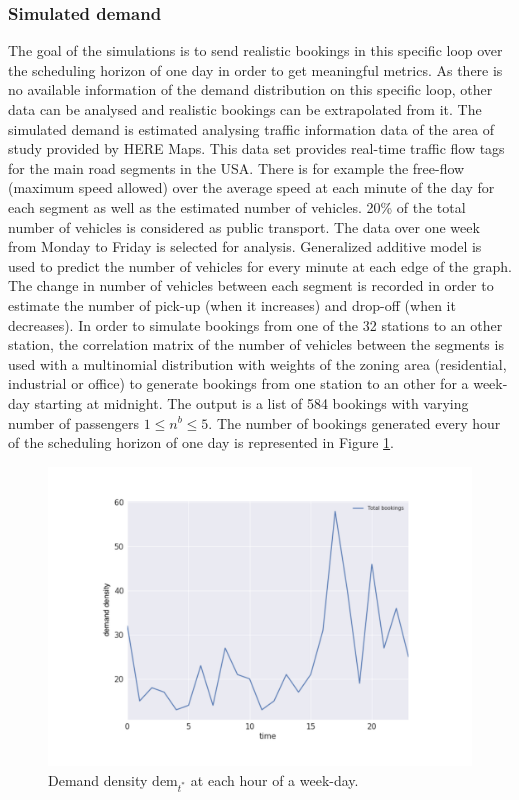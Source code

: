 \documentclass[12pt,a4paper]{article}
\begin{document}
\subsubsection{Simulated demand}\label{simdem}
The goal of the simulations is to send realistic bookings in this specific loop over the scheduling horizon of one day in order to get meaningful metrics. As there is no available information of the demand distribution on this specific loop, other data can be analysed and realistic bookings can be extrapolated from it. The simulated demand is estimated analysing traffic information data of the area of study provided by HERE Maps. This data set provides real-time traffic flow tags for the main road segments in the USA. There is for example the free-flow (maximum speed allowed) over the average speed at each minute of the day for each segment as well as the estimated number of vehicles. 20\% of the total number of vehicles is considered as public transport. The data over one week from Monday to Friday is selected for analysis. Generalized additive model is used to predict the number of vehicles for every minute at each edge of the graph. The change in number of vehicles between each segment is recorded in order to estimate the number of pick-up (when it increases) and drop-off (when it decreases). In order to simulate bookings from one of the 32 stations to an other station, the correlation matrix of the number of vehicles between the segments is used with a multinomial distribution with weights of the zoning area (residential, industrial or office) to generate bookings from one station to an other for a week-day starting at midnight. The output is a list of 584 bookings with varying number of passengers $1 \leq n^{b} \leq 5$. The number of bookings generated every hour of the scheduling horizon of one day is represented in Figure \ref{fig:demand}.

\begin{figure} 
  \centering
\includegraphics[scale=0.5]{./images/demand.pdf}
\caption{Demand density $\text{dem}_{t^{*}}$ at each hour of a week-day.}
\label{fig:demand}
\end{figure}
\end{document}
